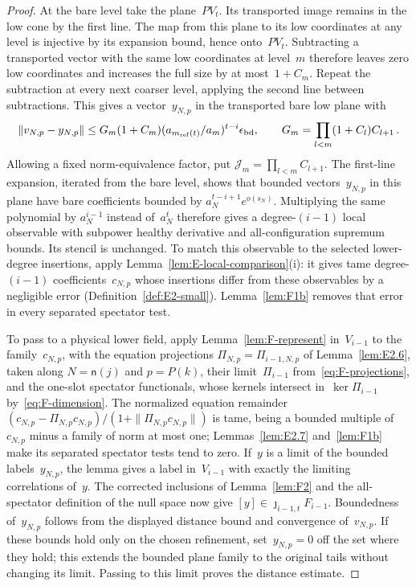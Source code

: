 \begin{proof}
At the bare level take the plane~$PV_t$. Its transported image remains in the low cone by the first line. The map from this plane to its low coordinates at any level is injective by its expansion bound, hence onto~$PV_t$. Subtracting a transported vector with the same low coordinates at level~$m$ therefore leaves zero low coordinates and increases the full size by at most~$1+C_m$. Repeat the subtraction at every next coarser level, applying the second line between subtractions. This gives a vector~$y_{N,p}$ in the transported bare low plane with
\begin{equation*}
\|v_{N,p}-y_{N,p}\|
\le G_m(1+C_m)(a_{m_{\mathrm{ref}}(t)}/a_m)^{t-i}\epsilon_{\rm bd},
\qquad G_m=\prod_{l<m}(1+C_l)C_{l+1}\,.
\end{equation*}
Allowing a fixed norm-equivalence factor, put $\mathcal J_m=\prod_{l<m}C_{l+1}$. The first-line expansion, iterated from the bare level, shows that bounded vectors~$y_{N,p}$ in this plane have bare coefficients bounded by $a_N^{t-i+1}e^{o(s_N)}$. Multiplying the same polynomial by $a_N^{i-1}$ instead of~$a_N^t$ therefore gives a degree-$(i-1)$ local observable with subpower healthy derivative and all-configuration supremum bounds. Its stencil is unchanged. To match this observable to the selected lower-degree insertions, apply Lemma~\ref{lem:E-local-comparison}(i): it gives tame degree-$(i-1)$ coefficients~$c_{N,p}$ whose insertions differ from these observables by a negligible error (Definition~\ref{def:E2-small}). Lemma~\ref{lem:F1b} removes that error in every separated spectator test.

To pass to a physical lower field, apply Lemma~\ref{lem:F-represent} in~$V_{i-1}$ to the family~$c_{N,p}$, with the equation projections $\Pi_{N,p}=\Pi_{i-1,N,p}$ of Lemma~\ref{lem:E2.6}, taken along $N=\mathsf n(j)$ and $p=P(k)$, their limit~$\Pi_{i-1}$ from~\eqref{eq:F-projections}, and the one-slot spectator functionals, whose kernels intersect in~$\ker\Pi_{i-1}$ by~\eqref{eq:F-dimension}. The normalized equation remainder $(c_{N,p}-\Pi_{N,p}c_{N,p})/(1+\|\Pi_{N,p}c_{N,p}\|)$ is tame, being a bounded multiple of~$c_{N,p}$ minus a family of norm at most one; Lemmas~\ref{lem:E2.7} and~\ref{lem:F1b} make its separated spectator tests tend to zero. If~$y$ is a limit of the bounded labels~$y_{N,p}$, the lemma gives a label in~$V_{i-1}$ with exactly the limiting correlations of~$y$. The corrected inclusions of Lemma~\ref{lem:F2} and the all-spectator definition of the null space now give $[y]\in\jmath_{i-1,t}F_{i-1}$. Boundedness of~$y_{N,p}$ follows from the displayed distance bound and convergence of~$v_{N,p}$. If these bounds hold only on the chosen refinement, set~$y_{N,p}=0$ off the set where they hold; this extends the bounded plane family to the original tails without changing its limit. Passing to this limit proves the distance estimate.


\end{proof}

